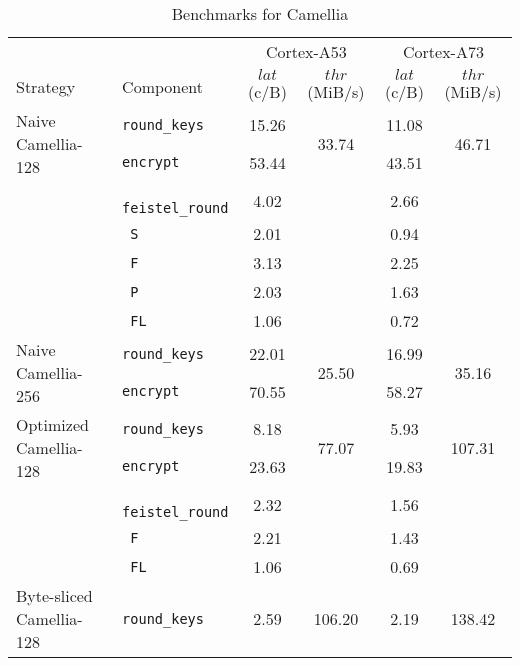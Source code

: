 \begin{table}[h!]
    \centering
    \caption{Benchmarks for Camellia}
    \scriptsize
    \begin{tabular}{llcccc}
        \toprule
        & & \multicolumn{2}{c}{Cortex-A53} & \multicolumn{2}{c}{Cortex-A73} \\
        \cmidrule(lr){3-4}\cmidrule(lr){5-6}
        Strategy & Component & $lat$ (c/B) & $thr$ (MiB/s) & $lat$ (c/B) & $thr$ (MiB/s) \\
        \midrule
        \multirow{2}{*}{Naive Camellia-128} & \texttt{round\_keys} & 15.26 & \multirow{2}{*}{33.74} & 11.08 & \multirow{2}{*}{46.71} \\
                                                & \texttt{encrypt} & 53.44 & &  43.51 & \\
        \cmidrule(lr){2-2}
                                                & \texttt{ feistel\_round} & 4.02 & & 2.66 & \\
                                                & \texttt{ S} & 2.01 & & 0.94 & \\
                                                & \texttt{ F} & 3.13 & & 2.25 & \\
                                                & \texttt{ P} & 2.03 & & 1.63 & \\
                                                & \texttt{ FL} & 1.06 & & 0.72 & \\
        \midrule
        \multirow{2}{*}{Naive Camellia-256} & \texttt{round\_keys} & 22.01 & \multirow{2}{*}{25.50} & 16.99 & \multirow{2}{*}{35.16} \\
                                                 & \texttt{encrypt} & 70.55 & & 58.27 & \\
        \midrule
        \multirow{2}{*}{Optimized Camellia-128} & \texttt{round\_keys} & 8.18 & \multirow{2}{*}{77.07} & 5.93 & \multirow{2}{*}{107.31} \\
                                                & \texttt{encrypt} & 23.63 & & 19.83 & \\
        \cmidrule(lr){2-2}
                                                & \texttt{ feistel\_round} & 2.32 & & 1.56 & \\
                                                & \texttt{ F} & 2.21 & & 1.43 & \\
                                                & \texttt{ FL} & 1.06 & & 0.69 & \\
        \midrule
        \multirow{2}{*}{Byte-sliced Camellia-128} & \texttt{round\_keys} & 2.59 & \multirow{2}{*}{106.20} & 2.19 & \multirow{2}{*}{138.42} \\

\end{tabular}
\end{table}
